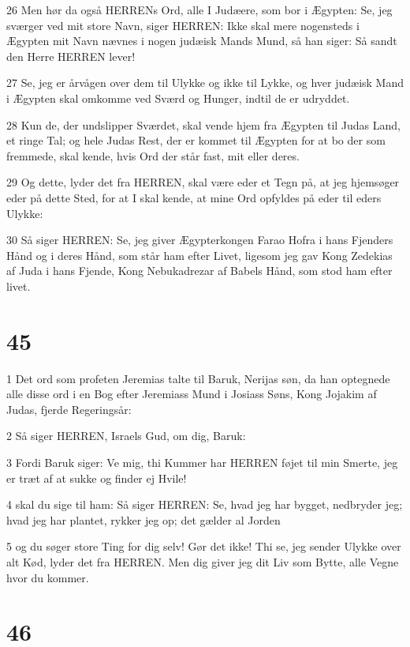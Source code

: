 \par 26 Men hør da også HERRENs Ord, alle I Judæere, som bor i Ægypten: Se, jeg sværger ved mit store Navn, siger HERREN: Ikke skal mere nogensteds i Ægypten mit Navn nævnes i nogen judæisk Mands Mund, så han siger: Så sandt den Herre HERREN lever!
\par 27 Se, jeg er årvågen over dem til Ulykke og ikke til Lykke, og hver judæisk Mand i Ægypten skal omkomme ved Sværd og Hunger, indtil de er udryddet.
\par 28 Kun de, der undslipper Sværdet, skal vende hjem fra Ægypten til Judas Land, et ringe Tal; og hele Judas Rest, der er kommet til Ægypten for at bo der som fremmede, skal kende, hvis Ord der står fast, mit eller deres.
\par 29 Og dette, lyder det fra HERREN, skal være eder et Tegn på, at jeg hjemsøger eder på dette Sted, for at I skal kende, at mine Ord opfyldes på eder til eders Ulykke:
\par 30 Så siger HERREN: Se, jeg giver Ægypterkongen Farao Hofra i hans Fjenders Hånd og i deres Hånd, som står ham efter Livet, ligesom jeg gav Kong Zedekias af Juda i hans Fjende, Kong Nebukadrezar af Babels Hånd, som stod ham efter livet.

\chapter{45}

\par 1 Det ord som profeten Jeremias talte til Baruk, Nerijas søn, da han optegnede alle disse ord i en Bog efter Jeremiass Mund i Josiass Søns, Kong Jojakim af Judas, fjerde Regeringsår:
\par 2 Så siger HERREN, Israels Gud, om dig, Baruk:
\par 3 Fordi Baruk siger: Ve mig, thi Kummer har HERREN føjet til min Smerte, jeg er træt af at sukke og finder ej Hvile!
\par 4 skal du sige til ham: Så siger HERREN: Se, hvad jeg har bygget, nedbryder jeg; hvad jeg har plantet, rykker jeg op; det gælder al Jorden
\par 5 og du søger store Ting for dig selv! Gør det ikke! Thi se, jeg sender Ulykke over alt Kød, lyder det fra HERREN. Men dig giver jeg dit Liv som Bytte, alle Vegne hvor du kommer.

\chapter{46}

